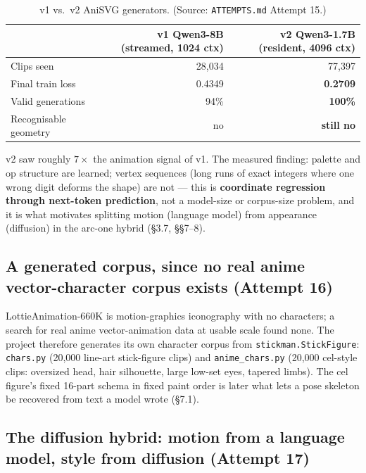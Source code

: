 \documentclass[11pt]{article}
\newcommand{\secsym}{\S}
\begin{document}
\begin{table}[h]
\centering
\caption{v1 vs.\ v2 AniSVG generators. (Source: \texttt{ATTEMPTS.md} Attempt 15.)}
\label{tab:anisvg-v1v2}
\begin{tabular}{@{}lrr@{}}
\toprule
 & v1 Qwen3-8B (streamed, 1024 ctx) & v2 Qwen3-1.7B (resident, 4096 ctx) \\
\midrule
Clips seen & 28{,}034 & 77{,}397 \\
Final train loss & 0.4349 & \textbf{0.2709} \\
Valid generations & 94\% & \textbf{100\%} \\
Recognisable geometry & no & \textbf{still no} \\
\bottomrule
\end{tabular}
\end{table}

v2 saw roughly $7\times$ the animation signal of v1. The measured finding:
palette and op structure are learned; vertex sequences (long runs of exact
integers where one wrong digit deforms the shape) are not --- this is
\textbf{coordinate regression through next-token prediction}, not a
model-size or corpus-size problem, and it is what motivates splitting
motion (language model) from appearance (diffusion) in the arc-one hybrid
(\secsym3.7, \secsym\secsym7--8).

\subsection{A generated corpus, since no real anime vector-character corpus exists (Attempt 16)}
\label{sec:generatedcorpus}

LottieAnimation-660K is motion-graphics iconography with no characters; a
search for real anime vector-animation data at usable scale found none.
The project therefore generates its own character corpus from
\texttt{stickman.StickFigure}: \texttt{chars.py} (20{,}000 line-art
stick-figure clips) and \texttt{anime\_chars.py} (20{,}000 cel-style
clips: oversized head, hair silhouette, large low-set eyes, tapered
limbs). The cel figure's fixed 16-part schema in fixed paint order is
later what lets a pose skeleton be recovered from text a model wrote
(\secsym7.1).

\subsection{The diffusion hybrid: motion from a language model, style from diffusion (Attempt 17)}
\label{sec:hybrid}
\end{document}

